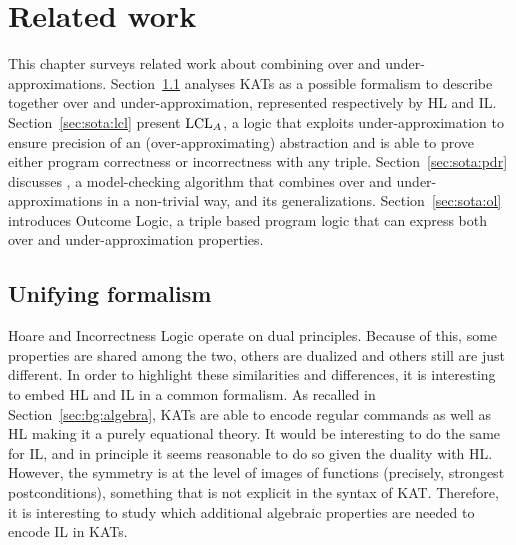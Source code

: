 
\chapter{Related work}\label{ch:sota}
This chapter surveys related work about combining over and under-approximations.
Section~\ref{sec:sota:kat} analyses KATs as a possible formalism to describe together over and under-approximation, represented respectively by HL and IL.
Section~\ref{sec:sota:lcl} present $\text{LCL}_A$, a logic that exploits under-approximation to ensure precision of an (over-approximating) abstraction and is able to prove either program correctness or incorrectness with any triple.
Section~\ref{sec:sota:pdr} discusses , a model-checking algorithm that combines over and under-approximations in a non-trivial way, and its generalizations.
Section~\ref{sec:sota:ol} introduces Outcome Logic, a triple based program logic that can express both over and under-approximation properties.

\section{Unifying formalism}\label{sec:sota:kat}
Hoare and Incorrectness Logic operate on dual principles. Because of this, some properties are shared among the two, others are dualized and others still are just different. In order to highlight these similarities and differences, it is interesting to embed HL and IL in a common formalism. As recalled in Section~\ref{sec:bg:algebra}, KATs are able to encode regular commands \cite{Kozen97} as well as HL \cite{Kozen00} making it a purely equational theory.
It would be interesting to do the same for IL, and in principle it seems reasonable to do so given the duality with HL. However, the symmetry is at the level of images of functions (precisely, strongest postconditions), something that is not explicit in the syntax of KAT. Therefore, it is interesting to study which additional algebraic properties are needed to encode IL in KATs.

